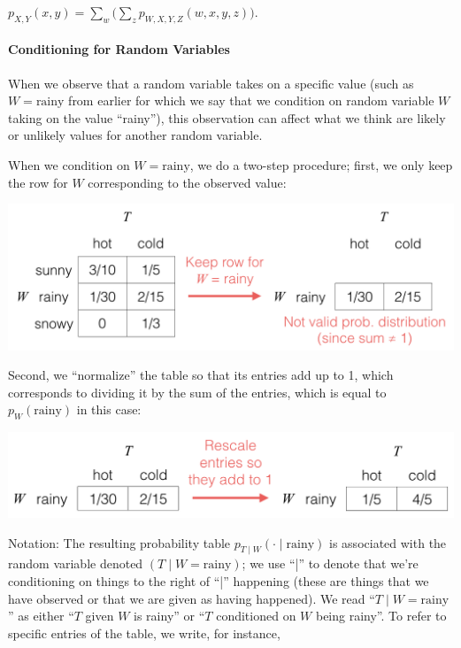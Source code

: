 \documentclass[6008notes.tex]{subfiles}
\begin{document}
$p_{X,Y}(x, y) = \sum _ w \Big( \sum _ z p_{W,X,Y,Z}(w,x,y,z) \Big).$
 
\paragraph{Conditioning for Random Variables}

When we observe that a random variable takes on a specific value (such as $W=\text {rainy}$ from earlier for which we say that we condition on random variable $W$ taking on the value ``rainy''), this observation can affect what we think are likely or unlikely values for another random variable.

When we condition on $W=\text {rainy}$, we do a two-step procedure; first, we only keep the row for $W$ corresponding to the observed value:

{\centering\includegraphics[scale=0.4]{images_sec-joint-rv-cond-restrict}}

Second, we ``normalize'' the table so that its entries add up to 1, which corresponds to dividing it by the sum of the entries, which is equal to $p_{W}(\text {rainy})$ in this case:

{\centering\includegraphics[scale=0.4]{images_sec-joint-rv-cond-renormalize}}

Notation: The resulting probability table $p_{T\mid W}(\cdot \mid \text {rainy})$ is associated with the random variable denoted $(T\mid W=\text {rainy})$; we use ``|'' to denote that we're conditioning on things to the right of ``|'' happening (these are things that we have observed or that we are given as having happened). We read ``$T\mid W=\text {rainy}$'' as either ``$T$ given $W$ is rainy'' or ``$T$ conditioned on $W$ being rainy''. To refer to specific entries of the table, we write, for instance,
\end{document}
